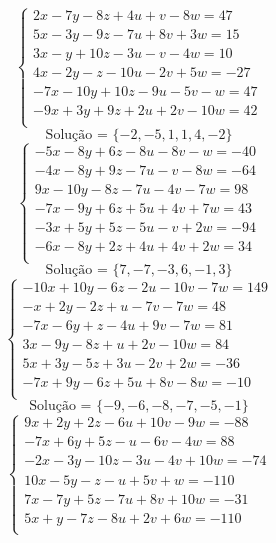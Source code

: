 \documentclass[12pt,oneside,a4paper]{article}
\begin{document}
\vspace{\baselineskip}
\begin{equation*}
\begin{cases}
2x-7y-8z+4u+v-8w=47 \\
5x-3y-9z-7u+8v+3w=15 \\
3x-y+10z-3u-v-4w=10 \\
4x-2y-z-10u-2v+5w=-27 \\
-7x-10y+10z-9u-5v-w=47 \\
-9x+3y+9z+2u+2v-10w=42 \\
\end{cases}
\end{equation*}
\begin{equation*}
\text{Solução = }\{-2,-5,1,1,4,-2\}
\end{equation*}
\vspace{\baselineskip}
\begin{equation*}
\begin{cases}
-5x-8y+6z-8u-8v-w=-40 \\
-4x-8y+9z-7u-v-8w=-64 \\
9x-10y-8z-7u-4v-7w=98 \\
-7x-9y+6z+5u+4v+7w=43 \\
-3x+5y+5z-5u-v+2w=-94 \\
-6x-8y+2z+4u+4v+2w=34 \\
\end{cases}
\end{equation*}
\begin{equation*}
\text{Solução = }\{7,-7,-3,6,-1,3\}
\end{equation*}
\vspace{\baselineskip}
\begin{equation*}
\begin{cases}
-10x+10y-6z-2u-10v-7w=149 \\
-x+2y-2z+u-7v-7w=48 \\
-7x-6y+z-4u+9v-7w=81 \\
3x-9y-8z+u+2v-10w=84 \\
5x+3y-5z+3u-2v+2w=-36 \\
-7x+9y-6z+5u+8v-8w=-10 \\
\end{cases}
\end{equation*}
\begin{equation*}
\text{Solução = }\{-9,-6,-8,-7,-5,-1\}
\end{equation*}
\vspace{\baselineskip}
\begin{equation*}
\begin{cases}
9x+2y+2z-6u+10v-9w=-88 \\
-7x+6y+5z-u-6v-4w=88 \\
-2x-3y-10z-3u-4v+10w=-74 \\
10x-5y-z-u+5v+w=-110 \\
7x-7y+5z-7u+8v+10w=-31 \\
5x+y-7z-8u+2v+6w=-110 \\
\end{cases}
\end{equation*}
\end{document}
